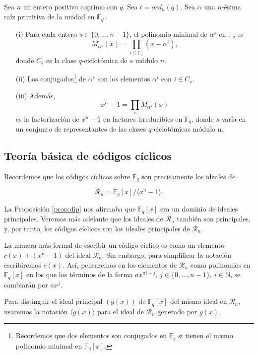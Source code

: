 \begin{teorema}\label{th:fac}
Sea $n$ un entero positivo coprimo con $q$. Sea $t = ord_n(q)$. Sea $\alpha$ una $n$-ésima raíz primitiva de la unidad en $\mathbb{F}_{q^t}$.
\begin{itemize}
    \item[(i)] Para cada entero $s \in \{0,\dots,n-1\}$, el polinomio minimal de $\alpha^s$ en $\mathbb{F}_q$ es $$M_{\alpha^s}(x) = \prod_{i \in C_s}(x - \alpha^i), $$
    donde $C_s$ es la clase $q$-ciclotómica de $s$ módulo $n$.
    \item[(ii)] Los conjugados\footnote{Recordemos que dos elementos  son conjugados en $\mathbb{F}_{q}$ si tienen el mismo polinomio minimal en $\mathbb{F}_{q}[x]$.} de $\alpha^s$  son los elementos $\alpha^i$ con $i \in C_s$.
    \item[(iii)] Además, $$x^n - 1 = \prod_{s}M_{\alpha^s}(x)$$ es la factorización de $x^n - 1$ en factores irreducibles en $\mathbb{F}_q$, donde $s$ varía en un conjunto de representantes de las clases $q$-ciclotómicas módulo n.
\end{itemize}
\end{teorema}

\subsection{Teoría básica de códigos cíclicos}

Recordemos que los códigos cíclicos sobre $\mathbb{F}_q$ son precisamente los ideales de

$$\mathcal{R}_n = \mathbb{F}_q[x]/\langle x^n-1 \rangle.$$

La Proposición \ref{prop:dip} nos afirmaba que $\mathbb{F}_q[x]$ era un dominio de ideales principales. Veremos más adelante que los ideales de $\mathcal{R}_n$ también son principales, y, por tanto, los códigos cíclicos son los ideales principales de $\mathcal{R}_n$.

La manera más formal de escribir un código cíclico es como un elemento $c(x) + (x^n - 1)$ del ideal $\mathcal{R}_n$. Sin embargo, para simplificar la notación escribiremos $c(x)$. Así, pensaremos en los elementos de $\mathcal{R}_n$ como polinomios en $\mathbb{F}_q[x]$ en los que los términos de la forma $ax^{ni+j}$, $ j \in \{0,\dots,n-1\}, \ i \in \mathds{N}$, se cambiarán por $ax^j$. 

Para distinguir el ideal principal $(g(x))$ de $\mathbb{F}_q[x]$ del mismo ideal en $\mathcal{R}_n$, usaremos la notación $\langle g(x) \rangle$ para el ideal de $\mathcal{R}_n$ generado por $g(x)$. 

